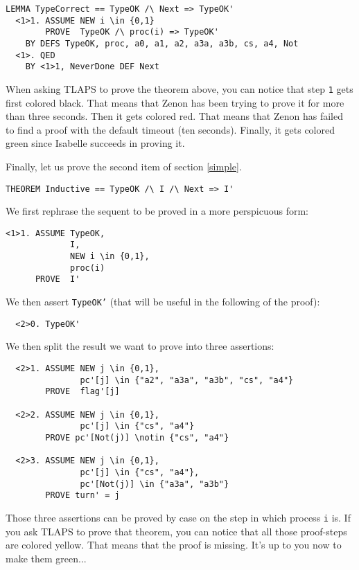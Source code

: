 \documentclass{enonce}
\begin{document}
\begin{verbatim}
LEMMA TypeCorrect == TypeOK /\ Next => TypeOK'
  <1>1. ASSUME NEW i \in {0,1}
        PROVE  TypeOK /\ proc(i) => TypeOK'
    BY DEFS TypeOK, proc, a0, a1, a2, a3a, a3b, cs, a4, Not
  <1>. QED
    BY <1>1, NeverDone DEF Next
\end{verbatim}

\noindent When asking TLAPS to prove the theorem above, you can notice that step {\tt<1>1} gets first colored black. That means that Zenon has been trying to prove it for more than three seconds. Then it gets colored red. That means that Zenon has failed to find a proof with the default timeout (ten seconds). Finally, it gets colored green since Isabelle succeeds in proving it.

\bigskip

\noindent Finally, let us prove the second item of section \ref{simple}.

\begin{verbatim}
THEOREM Inductive == TypeOK /\ I /\ Next => I'
\end{verbatim}

\noindent We first rephrase the sequent to be proved in a more perspicuous form:

\begin{verbatim}
<1>1. ASSUME TypeOK,
             I,
             NEW i \in {0,1},
             proc(i)
      PROVE  I'
\end{verbatim}

\noindent We then assert {\tt TypeOK'} (that will be useful in the following of the proof):

\begin{verbatim}
  <2>0. TypeOK'
\end{verbatim}

\noindent We then split the result we want to prove into three assertions:

\begin{verbatim}
  <2>1. ASSUME NEW j \in {0,1},
               pc'[j] \in {"a2", "a3a", "a3b", "cs", "a4"}
        PROVE  flag'[j]
        
  <2>2. ASSUME NEW j \in {0,1},
               pc'[j] \in {"cs", "a4"}
        PROVE pc'[Not(j)] \notin {"cs", "a4"}
        
  <2>3. ASSUME NEW j \in {0,1},
               pc'[j] \in {"cs", "a4"},
               pc'[Not(j)] \in {"a3a", "a3b"}
        PROVE turn' = j
\end{verbatim}

\noindent Those three assertions can be proved by case on the step in which process {\tt i} is.
If you ask TLAPS to prove that theorem, you can notice that all those proof-steps are colored yellow. That means that the proof is missing. It's up to you now to make them green...
\end{document}
